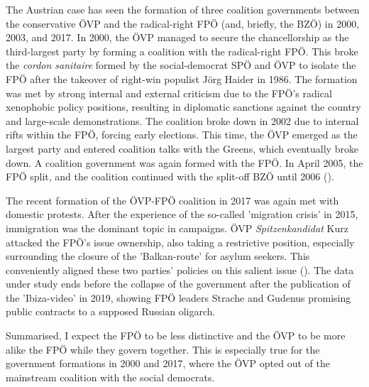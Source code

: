 \documentclass{article}
\begin{document}

The Austrian case has seen the formation of three coalition governments between the conservative ÖVP and the radical-right FPÖ (and, briefly, the BZÖ) in 2000, 2003, and 2017. In 2000, the ÖVP managed to secure the chancellorship as the third-largest party by forming a coalition with the radical-right FPÖ. This broke the \textit{cordon sanitaire} formed by the social-democrat SPÖ and ÖVP to isolate the FPÖ after the takeover of right-win populist Jörg Haider in 1986. The formation was met by strong internal and external criticism due to the FPÖ's radical xenophobic policy positions, resulting in diplomatic sanctions against the country and large-scale demonstrations. The coalition broke down in 2002 due to internal rifts within the FPÖ, forcing early elections. This time, the ÖVP emerged as the largest party and entered coalition talks with the Greens, which eventually broke down. A coalition government was again formed with the FPÖ. In April 2005, the FPÖ split, and the coalition continued with the split-off BZÖ until 2006 (\cite{Luther2010}).\par

The recent formation of the ÖVP-FPÖ coalition in 2017 was again met with domestic protests. After the experience of the so-called 'migration crisis' in 2015, immigration was the dominant topic in campaigns. ÖVP \textit{Spitzenkandidat} Kurz attacked the FPÖ's issue ownership, also taking  a restrictive position, especially surrounding the closure of the 'Balkan-route' for asylum seekers. This conveniently aligned these two parties' policies on this salient issue (\cite{Bodlos2018}). The data under study ends before the collapse of the government after the publication of the 'Ibiza-video' in 2019, showing FPÖ leaders Strache and Gudenus promising public contracts to a supposed Russian oligarch.\par 

Summarised, I expect the FPÖ to be less distinctive and the ÖVP to be more alike the FPÖ while they govern together. This is especially true for the government formations in 2000 and 2017, where the ÖVP opted out of the mainstream coalition with the social democrats. \par
\end{document}
